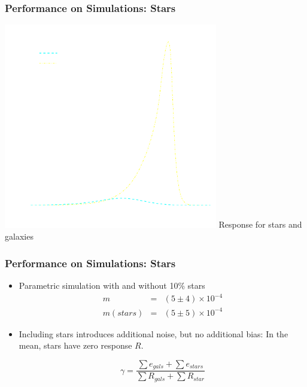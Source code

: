 \documentclass{beamer}
\begin{document}
\frame
{
    \frametitle{Performance on Simulations: Stars}
 
    \begin{center}
        \includegraphics[width=0.7\textwidth]{R-dt-with-stars-icolor.pdf}
        \newline
        {\large Response for stars and galaxies}
    \end{center}

}



\frame
{
    \frametitle{Performance on Simulations: Stars}

 
    \begin{itemize}

        \item Parametric simulation with and without {\color{gold} 10\% stars}
             {\color{lightskyblue} 
                 \begin{eqnarray}
                     m        & = & (5 \pm 4) \times 10^{-4} \nonumber \\
                     m(stars) & = & (5 \pm 5) \times 10^{-4} \nonumber
                 \end{eqnarray}
             }

         \item Including stars introduces additional noise, but no
             additional bias: In the mean, stars have zero response {\color{gold} $R$}.

             {\color{mygray} 
                 \begin{equation}
                     \gamma = \frac{\sum e_{gals} + \sum e_{stars}}{\sum R_{gals} + \sum R_{star}} \nonumber
                 \end{equation}
             }


    \end{itemize}

}
\end{document}
